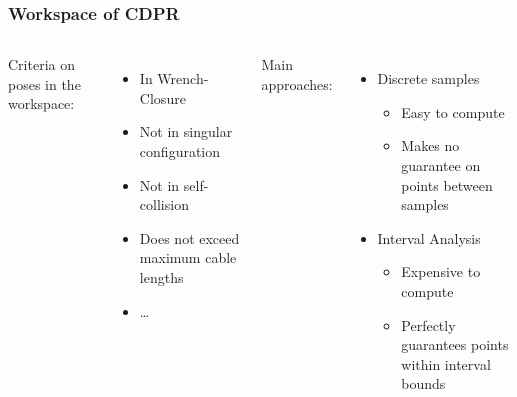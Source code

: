 \documentclass{beamer}
\begin{document}
	\begin{frame}
		\frametitle{Workspace of CDPR}

		\begin{columns}
			Criteria on poses in the workspace:

			\begin{itemize}
				\item

					In Wrench-Closure

				\item

					Not in singular configuration

				\item

					Not in self-collision

				\item

					Does not exceed maximum cable lengths

				\item

					\ldots
			\end{itemize}


			Main approaches:

			\begin{itemize}

				\item

					Discrete samples

					\begin{itemize}
						\item

							Easy to compute

						\item

							Makes no guarantee on points between samples
					\end{itemize}

				\item

					Interval Analysis

					\begin{itemize}

						\item

							Expensive to compute

						\item

							Perfectly guarantees points within interval bounds

					\end{itemize}
			\end{itemize}
		\end{columns}
	\end{frame}
\end{document}
